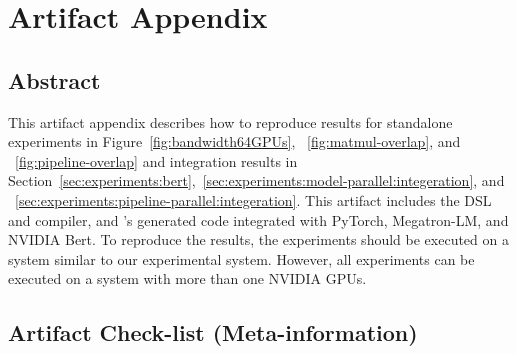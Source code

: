 
\appendix
\section{Artifact Appendix}

\subsection{Abstract}

This artifact appendix describes how to reproduce results for
standalone experiments in Figure~\ref{fig:bandwidth64GPUs},
~\ref{fig:matmul-overlap}, and ~\ref{fig:pipeline-overlap} and integration 
results in Section~\ref{sec:experiments:bert},~\ref{sec:experiments:model-parallel:integeration}, and ~\ref{sec:experiments:pipeline-parallel:integeration}.
This artifact includes the \tool{} DSL and compiler, and \tool{}'s generated code integrated 
with PyTorch, Megatron-LM, and NVIDIA Bert.
To reproduce the results, the experiments should be executed on a system similar to our experimental system.
However, all experiments can be executed on a system with more than one NVIDIA GPUs.

\subsection{Artifact Check-list (Meta-information)}

